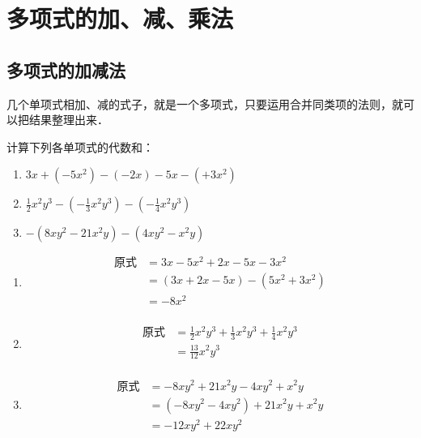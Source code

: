 \section{多项式的加、减、乘法}
\subsection{多项式的加减法}
几个单项式相加、减的式子，就是一个多项式，只要运用合并同类项的法则，就可以把结果整理出来．

\begin{example}
    计算下列各单项式的代数和：
\begin{enumerate}
    \item $3x+(-5x^2)-(-2x)-5x-(+3x^2)$
    \item $\frac{1}{2}x^2y^3-\left(-\frac{1}{3}x^2y^3\right)-\left(-\frac{1}{4}x^2y^3\right)$
    \item $-(8xy^2-21x^2y)-(4xy^2-x^2y)$
\end{enumerate}
\end{example}

\begin{solution}
    \begin{enumerate}
        \item \begin{align*}
            \text{原式}&=3x-5x^2+2x-5x-3x^2 \tag{去括号}\\
            &=(3x+2x-5x)-(5x^2+3x^2)\tag{交换、结合律}\\
            &=-8x^2 \tag{合并同类项法则}\\
        \end{align*}
        \item \begin{align*}
            \text{原式}&=\frac{1}{2}x^2y^3+\frac{1}{3}x^2y^3+\frac{1}{4}x^2y^3\tag{去括号}\\
            &=\frac{13}{12}x^2y^3  \tag{合并同类项法则}\\
        \end{align*}
        \item \begin{align*}
            \text{原式}&=-8xy^2+21x^2y-4xy^2+x^2y\\
            &=(-8xy^2-4xy^2)+21x^2y+x^2y\\
            &=-12xy^2+22xy^2
        \end{align*}
    \end{enumerate}
\end{solution}

